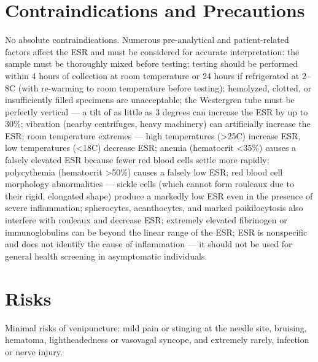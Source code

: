 \section*{Contraindications and Precautions}
No absolute contraindications. Numerous pre-analytical and patient-related factors affect the ESR and must be considered for accurate interpretation: the sample must be thoroughly mixed before testing; testing should be performed within 4 hours of collection at room temperature or 24 hours if refrigerated at 2--8\textdegree{}C (with re-warming to room temperature before testing); hemolyzed, clotted, or insufficiently filled specimens are unacceptable; the Westergren tube must be perfectly vertical --- a tilt of as little as 3 degrees can increase the ESR by up to 30\%; vibration (nearby centrifuges, heavy machinery) can artificially increase the ESR; room temperature extremes --- high temperatures (>25\textdegree{}C) increase ESR, low temperatures (<18\textdegree{}C) decrease ESR; anemia (hematocrit <35\%) causes a falsely elevated ESR because fewer red blood cells settle more rapidly; polycythemia (hematocrit >50\%) causes a falsely low ESR; red blood cell morphology abnormalities --- sickle cells (which cannot form rouleaux due to their rigid, elongated shape) produce a markedly low ESR even in the presence of severe inflammation; spherocytes, acanthocytes, and marked poikilocytosis also interfere with rouleaux and decrease ESR; extremely elevated fibrinogen or immunoglobulins can be beyond the linear range of the ESR; ESR is nonspecific and does not identify the cause of inflammation --- it should not be used for general health screening in asymptomatic individuals.

\section*{Risks}
Minimal risks of venipuncture: mild pain or stinging at the needle site, bruising, hematoma, lightheadedness or vasovagal syncope, and extremely rarely, infection or nerve injury.

